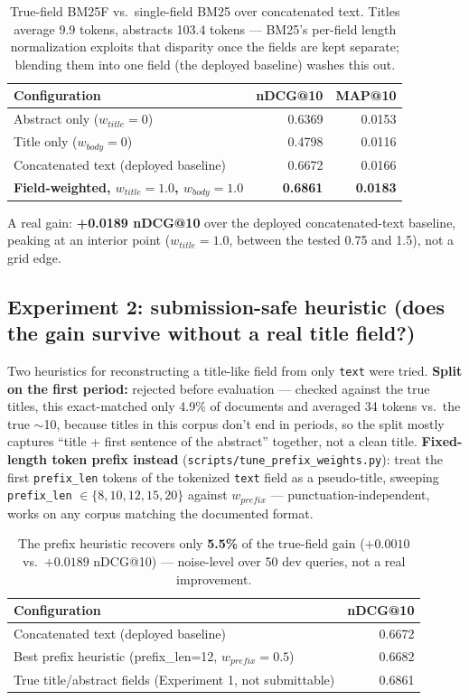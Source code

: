 \documentclass[11pt]{article}
\begin{document}
\begin{table}[h]
\centering
\begin{tabular}{lrr}
\toprule
Configuration & nDCG@10 & MAP@10 \\
\midrule
Abstract only ($w_{title}{=}0$) & 0.6369 & 0.0153 \\
Title only ($w_{body}{=}0$) & 0.4798 & 0.0116 \\
Concatenated text (deployed baseline) & 0.6672 & 0.0166 \\
\textbf{Field-weighted, $w_{title}{=}1.0$, $w_{body}{=}1.0$} & \textbf{0.6861} & \textbf{0.0183} \\
\bottomrule
\end{tabular}
\caption{True-field BM25F vs.\ single-field BM25 over concatenated text.
Titles average 9.9 tokens, abstracts 103.4 tokens --- BM25's per-field
length normalization exploits that disparity once the fields are kept
separate; blending them into one field (the deployed baseline) washes
this out.}
\end{table}

\noindent A real gain: \textbf{+0.0189 nDCG@10} over the deployed
concatenated-text baseline, peaking at an interior point ($w_{title}{=}1.0$,
between the tested 0.75 and 1.5), not a grid edge.

\subsection{Experiment 2: submission-safe heuristic (does the gain survive without a real title field?)}
Two heuristics for reconstructing a title-like field from only
\texttt{text} were tried. \textbf{Split on the first period:} rejected
before evaluation --- checked against the true titles, this exact-matched
only 4.9\% of documents and averaged 34 tokens vs.\ the true $\sim$10,
because titles in this corpus don't end in periods, so the split mostly
captures ``title + first sentence of the abstract'' together, not a clean
title. \textbf{Fixed-length token prefix instead}
(\texttt{scripts/tune\_prefix\_weights.py}): treat the first
\texttt{prefix\_len} tokens of the tokenized \texttt{text} field as a
pseudo-title, sweeping \texttt{prefix\_len} $\in \{8,10,12,15,20\}$
against $w_{prefix}$ --- punctuation-independent, works on any corpus
matching the documented format.

\begin{table}[h]
\centering
\begin{tabular}{lr}
\toprule
Configuration & nDCG@10 \\
\midrule
Concatenated text (deployed baseline) & 0.6672 \\
Best prefix heuristic (prefix\_len=12, $w_{prefix}{=}0.5$) & 0.6682 \\
True title/abstract fields (Experiment 1, not submittable) & 0.6861 \\
\bottomrule
\end{tabular}
\caption{The prefix heuristic recovers only \textbf{5.5\%} of the true-field
gain ($+0.0010$ vs.\ $+0.0189$ nDCG@10) --- noise-level over 50 dev
queries, not a real improvement.}
\end{table}
\end{document}
